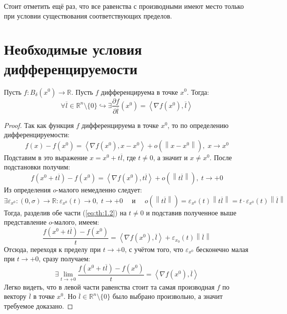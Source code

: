 \documentclass[11pt]{article}
\begin{document}
\begin{remark}
    Стоит отметить ещё раз, что все равенства с производными имеют место только при условии существования соответствующих пределов. 
\end{remark}

\section{Необходимые условия дифференцируемости}

\begin{theorem}
    Пусть $f \colon B_\delta \left(x^0\right) \to \mathbb{R}$. Пусть $f$ дифференцируема в точке $x^0$. Тогда:
    \[\forall \overline{l} \in \mathbb{R}^n \setminus \{0\} \hookrightarrow \exists \frac{\partial f }{\partial \overline{l}} \left(x^0\right) = \left\langle \nabla f\left(x^0\right), \overline{l}\right\rangle \]
\end{theorem}

\begin{proof}
    Так как функция $f$ дифференцируема в точке $x^0$, то по определению дифференцируемости:
    \[f\left(x\right) - f\left(x^0\right) = \left\langle \nabla f\left(x^0\right), x - x^0 \right\rangle + o \left(\left\lVert x - x^0 \right\rVert \right), \; x \to x^0\]
    Подставим в это выражение $x = x^0 + t \overline{l}$, где $t \neq 0$, а значит и $x \neq x^0$. После подстановки получим:
    \begin{equation*} \label{eq:th:1.2} \tag{$\ast \ast$}
        f\left(x^0 + t \overline{l} \right) - f\left(x^0\right) = \left\langle \nabla f\left(x^0\right), t \overline{l} \right\rangle + o \left(\left\lVert t \overline{l} \right\rVert \right), \; t \to +0
    \end{equation*}
    Из определения $o$-малого немедленно следует:
    \[\exists \varepsilon_{x^0} \colon (0, \sigma) \to \mathbb{R}: \varepsilon_{x^0}(t) \to 0, \; t \to +0 \quad \text{ и } \quad  o \left(\left\lVert t \overline{l} \right\rVert \right) = \varepsilon_{x^0}(t) \left\lVert t \overline{l} \right\rVert = t \cdot \varepsilon_{x^0}(t) \left\lVert \overline{l} \right\rVert \]
    Тогда, разделив обе части (\ref{eq:th:1.2}) на $t \neq 0$ и подставив полученное выше представление $o$-малого, имеем:
    \[\frac{f\left(x^0 + t \overline{l} \right) - f\left(x^0\right)}{t} = \left\langle \nabla f \left(x^0\right), \overline{l} \right\rangle + \varepsilon_{x_0}(t) \left\lVert \overline{l} \right\rVert  \]
    Отсюда, переходя к пределу при $t \to +0$, с учётом того, что $\varepsilon_{x^0}$ бесконечно малая при $t \to +0$, сразу получаем:
    \[\exists \lim_{t \to +0} \frac{f\left(x^0 + t \overline{l} \right) - f\left(x^0\right)}{t} = \left\langle \nabla f \left(x^0\right), \overline{l} \right\rangle\]
    Легко видеть, что в левой части равенства стоит та самая производная $f$ по вектору $\overline{l}$ в точке $x^0$.
    Но $\overline{l} \in \mathbb{R}^n \setminus \{0\}$ было выбрано произвольно, а значит требуемое доказано.
\end{proof}
\end{document}
